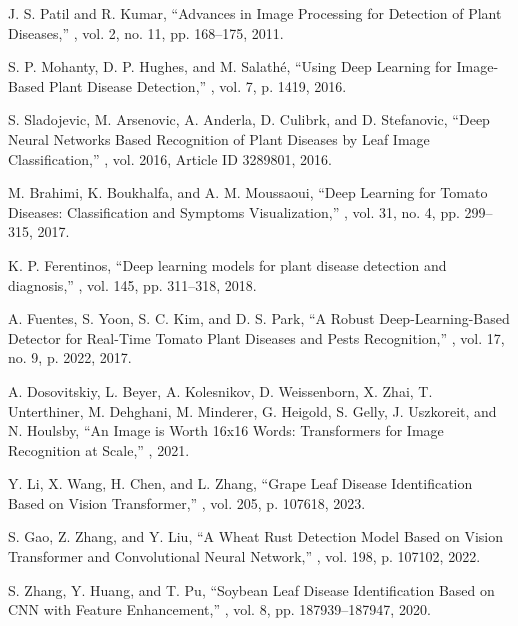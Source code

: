 \documentclass[preprint,12pt]{elsarticle}
\begin{document}
\begin{thebibliography}{99}

J. S. Patil and R. Kumar,
\newblock ``Advances in Image Processing for Detection of Plant Diseases,''
, vol. 2, no. 11, pp. 168–175, 2011.

S. P. Mohanty, D. P. Hughes, and M. Salathé,
\newblock ``Using Deep Learning for Image-Based Plant Disease Detection,''
, vol. 7, p. 1419, 2016.

S. Sladojevic, M. Arsenovic, A. Anderla, D. Culibrk, and D. Stefanovic,
\newblock ``Deep Neural Networks Based Recognition of Plant Diseases by Leaf Image Classification,''
, vol. 2016, Article ID 3289801, 2016.

M. Brahimi, K. Boukhalfa, and A. M. Moussaoui,
\newblock ``Deep Learning for Tomato Diseases: Classification and Symptoms Visualization,''
, vol. 31, no. 4, pp. 299–315, 2017.

K. P. Ferentinos,
\newblock ``Deep learning models for plant disease detection and diagnosis,''
, vol. 145, pp. 311–318, 2018.

A. Fuentes, S. Yoon, S. C. Kim, and D. S. Park,
\newblock ``A Robust Deep-Learning-Based Detector for Real-Time Tomato Plant Diseases and Pests Recognition,''
, vol. 17, no. 9, p. 2022, 2017.

A. Dosovitskiy, L. Beyer, A. Kolesnikov, D. Weissenborn, X. Zhai, T. Unterthiner, M. Dehghani, M. Minderer, G. Heigold, S. Gelly, J. Uszkoreit, and N. Houlsby,
\newblock ``An Image is Worth 16x16 Words: Transformers for Image Recognition at Scale,''
, 2021.

Y. Li, X. Wang, H. Chen, and L. Zhang,
\newblock ``Grape Leaf Disease Identification Based on Vision Transformer,''
, vol. 205, p. 107618, 2023.

S. Gao, Z. Zhang, and Y. Liu,
\newblock ``A Wheat Rust Detection Model Based on Vision Transformer and Convolutional Neural Network,''
, vol. 198, p. 107102, 2022.

S. Zhang, Y. Huang, and T. Pu,
\newblock ``Soybean Leaf Disease Identification Based on CNN with Feature Enhancement,''
, vol. 8, pp. 187939–187947, 2020.

\end{thebibliography}
\end{document}
